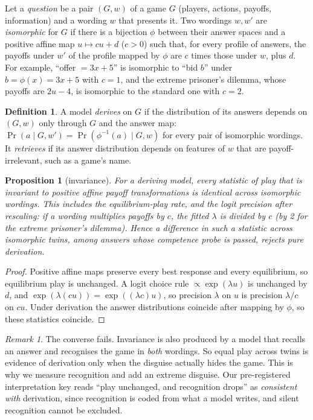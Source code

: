\documentclass[10pt]{article}
\newtheorem{proposition}{Proposition}
\theoremstyle{definition}
\newtheorem{definition}{Definition}
\theoremstyle{remark}
\newtheorem*{remark}{Remark}
\newcommand{\lam}{\lambda}
\begin{document}
Let a \emph{question} be a pair $(G, w)$ of a game $G$ (players, actions, payoffs, information)
and a wording $w$ that presents it. Two wordings $w, w'$ are \emph{isomorphic} for $G$ if there is
a bijection $\phi$ between their answer spaces and a positive affine map $u\mapsto cu+d$ ($c>0$)
such that, for every profile of answers, the payoffs under $w'$ of the profile mapped by $\phi$
are $c$ times those under $w$, plus $d$. For example, ``offer $=3x+5$'' is isomorphic to ``bid
$b$'' under $b = \phi(x) = 3x+5$ with $c=1$, and the extreme prisoner's dilemma, whose payoffs are
$2u-4$, is isomorphic to the standard one with $c=2$.

\begin{definition}
A model \emph{derives} on $G$ if the distribution of its answers depends on $(G,w)$ only through
$G$ and the answer map: $\Pr(a \mid G, w') = \Pr(\phi^{-1}(a) \mid G, w)$ for every pair of
isomorphic wordings. It \emph{retrieves} if its answer distribution depends on features of $w$
that are payoff-irrelevant, such as a game's name.
\end{definition}

\begin{proposition}[invariance]\label{prop:invariance}
For a deriving model, every statistic of play that is invariant to positive affine payoff
transformations is identical across isomorphic wordings. This includes the equilibrium-play
rate, and the logit precision after rescaling: if a wording multiplies payoffs by $c$, the
fitted $\lam$ is divided by $c$ (by 2 for the extreme prisoner's dilemma). Hence a difference in
such a statistic across isomorphic twins, among answers whose competence probe is passed, rejects
pure derivation.
\end{proposition}
\begin{proof}
Positive affine maps preserve every best response and every equilibrium, so equilibrium play is
unchanged. A logit choice rule $\propto\exp(\lam u)$ is unchanged by $d$, and $\exp(\lam(cu))=
\exp((\lam c)u)$, so precision $\lam$ on $u$ is precision $\lam/c$ on $cu$. Under derivation the
answer distributions coincide after mapping by $\phi$, so these statistics coincide.
\end{proof}

\begin{remark}
The converse fails. Invariance is also produced by a model that recalls an answer and
recognises the game in \emph{both} wordings. So equal play across twins is evidence of
derivation only when the disguise actually hides the game. This is why we measure recognition
and add an extreme disguise. Our pre-registered interpretation key reads ``play unchanged, and
recognition drops'' as \emph{consistent with} derivation, since recognition is coded from what a
model writes, and silent recognition cannot be excluded.
\end{remark}
\end{document}
